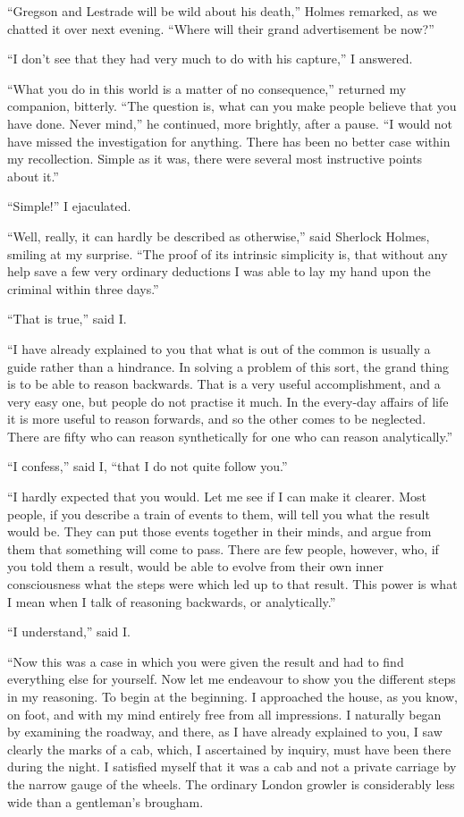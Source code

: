 \documentclass[12pt,english]{book}
\begin{document}
{}``Gregson and Lestrade will be wild about his death,'' Holmes
remarked, as we chatted it over next evening. {}``Where will their
grand advertisement be now?''

{}``I don't see that they had very much to do with his capture,''
I answered.

{}``What you do in this world is a matter of no consequence,'' returned
my companion, bitterly. {}``The question is, what can you make people
believe that you have done. Never mind,'' he continued, more brightly,
after a pause. {}``I would not have missed the investigation for
anything. There has been no better case within my recollection. Simple
as it was, there were several most instructive points about it.''

{}``Simple!'' I ejaculated.

{}``Well, really, it can hardly be described as otherwise,'' said
Sherlock Holmes, smiling at my surprise. {}``The proof of its intrinsic
simplicity is, that without any help save a few very ordinary deductions
I was able to lay my hand upon the criminal within three days.''

{}``That is true,'' said I.

{}``I have already explained to you that what is out of the common
is usually a guide rather than a hindrance. In solving a problem of
this sort, the grand thing is to be able to reason backwards. That
is a very useful accomplishment, and a very easy one, but people do
not practise it much. In the every-day affairs of life it is more
useful to reason forwards, and so the other comes to be neglected.
There are fifty who can reason synthetically for one who can reason
analytically.''

{}``I confess,'' said I, {}``that I do not quite follow you.''

{}``I hardly expected that you would. Let me see if I can make it
clearer. Most people, if you describe a train of events to them, will
tell you what the result would be. They can put those events together
in their minds, and argue from them that something will come to pass.
There are few people, however, who, if you told them a result, would
be able to evolve from their own inner consciousness what the steps
were which led up to that result. This power is what I mean when I
talk of reasoning backwards, or analytically.''

{}``I understand,'' said I.

{}``Now this was a case in which you were given the result and had
to find everything else for yourself. Now let me endeavour to show
you the different steps in my reasoning. To begin at the beginning.
I approached the house, as you know, on foot, and with my mind entirely
free from all impressions. I naturally began by examining the roadway,
and there, as I have already explained to you, I saw clearly the marks
of a cab, which, I ascertained by inquiry, must have been there during
the night. I satisfied myself that it was a cab and not a private
carriage by the narrow gauge of the wheels. The ordinary London growler
is considerably less wide than a gentleman's brougham.
\end{document}

